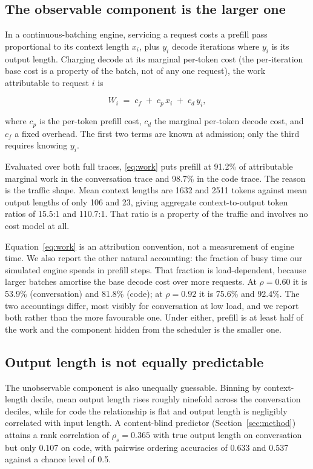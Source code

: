 \documentclass[conference,10pt,letterpaper]{IEEEtran}
\begin{document}
\subsection{The observable component is the larger one}
In a continuous-batching engine, servicing a request costs a prefill pass
proportional to its context length $x_i$, plus $y_i$ decode iterations where
$y_i$ is its output length. Charging decode at its marginal per-token cost
(the per-iteration base cost is a property of the batch, not of any one
request), the work attributable to request $i$ is

\begin{equation}
  \label{eq:work}
  W_i \;=\; c_f \;+\; c_p\,x_i \;+\; c_d\,y_i ,
\end{equation}

\noindent where $c_p$ is the per-token prefill cost, $c_d$ the marginal
per-token decode cost, and $c_f$ a fixed overhead. The first two terms are known
at admission; only the third requires knowing $y_i$.

Evaluated over both full traces, \eqref{eq:work} puts prefill at 91.2\% of
attributable marginal work in the conversation trace and 98.7\% in the code
trace. The reason is the traffic shape. Mean context lengths are 1632 and 2511
tokens against mean output lengths of only 106 and 23, giving aggregate
context-to-output token ratios of 15.5:1 and 110.7:1. That ratio is a property
of the traffic and involves no cost model at all.

Equation~\eqref{eq:work} is an attribution convention, not a measurement of
engine time. We also report the other natural accounting:
the fraction of busy time our simulated engine spends in prefill
steps. That fraction is load-dependent, because larger batches amortise the
base decode cost over more requests. At $\rho=0.60$ it is 53.9\% (conversation)
and 81.8\% (code); at $\rho=0.92$ it is 75.6\% and 92.4\%. The two accountings
differ, most visibly for conversation at low load, and we report both rather
than the more favourable one. Under either, prefill is at least half of the
work and the component hidden from the scheduler is the smaller one.

\subsection{Output length is not equally predictable}
The unobservable component is also unequally guessable. Binning by context-length
decile, mean output length rises roughly ninefold across the conversation
deciles, while for code the relationship is flat and output length is negligibly
correlated with input length. A content-blind predictor
(Section~\ref{sec:method}) attains a rank correlation of $\rho_s = 0.365$ with
true output length on conversation but only $0.107$ on code, with pairwise
ordering accuracies of 0.633 and 0.537 against a chance level of 0.5.
\end{document}
